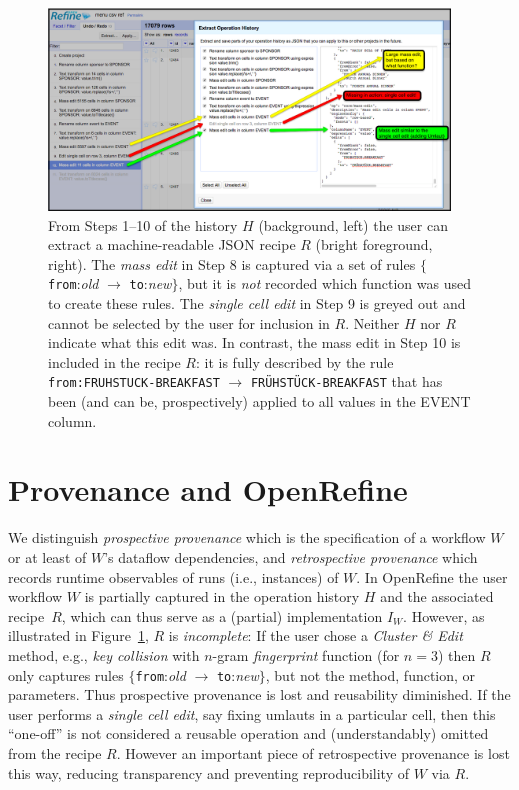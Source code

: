 \documentclass[runningheads]{llncs}
\begin{document}
\begin{figure}[t]
\centering
\includegraphics[width=0.95\textwidth]{figs/OR-missing-brighter.png} 
\caption{From Steps 1--10  of the history $H$ (background, left) the user can extract a machine-readable JSON recipe $R$ (bright foreground, right). The \emph{mass edit} in Step 8 is captured via a set of rules $\{$\texttt{from}:\emph{old} $\to$ \texttt{to}:\emph{new}$\}$, but it is \emph{not} recorded which function was used to create these rules. The \emph{single cell edit} in Step 9 is greyed out and cannot be selected by the user for inclusion in  $R$. Neither $H$ nor  $R$ indicate what this edit was. In contrast, the mass edit in Step 10 is included in the recipe $R$: it is fully described by the rule \texttt{from:FRUHSTUCK-BREAKFAST} $\to$ \texttt{FR\"UHST\"UCK-BREAKFAST} that has been (and can be, prospectively)  applied  to all values in the EVENT column.
}  
\label{fig:missing} 
\end{figure}



\section{Provenance and OpenRefine}\label{sec:prov-openr}

We distinguish \emph{prospective provenance} which is the specification of a workflow $W$ or at
least of $W$'s dataflow dependencies, and \emph{retrospective provenance} which records runtime
observables of runs (i.e., instances) of $W$. In OpenRefine the user workflow $W$ is partially
captured in the operation history $H$ and the associated recipe~$R$, which can thus serve as a (partial)
implementation $I_W$. However, as illustrated in Figure~\ref{fig:missing}, $R$ is \emph{incomplete}:
If the user chose a \emph{Cluster \& Edit} method, e.g., \emph{key collision} with $n$-gram
\emph{fingerprint} function (for $n=3$) then $R$ only captures rules $\{$\texttt{from}:\emph{old}
$\to$ \texttt{to}:\emph{new}$\}$, but not the method, function, or parameters. Thus prospective
provenance is lost and reusability diminished. If the user performs a \emph{single cell edit}, say
fixing umlauts in a particular cell, then this ``one-off'' is not considered a reusable operation
and (understandably) omitted from the recipe $R$. However an important piece of retrospective
provenance is lost this way, reducing transparency and preventing reproducibility of $W$ via $R$.
\end{document}
